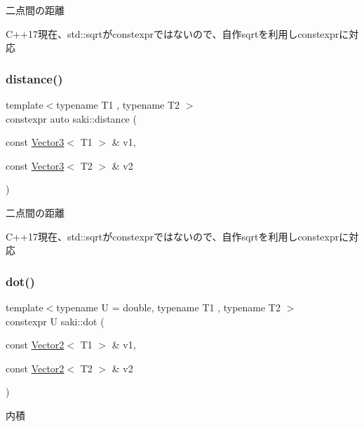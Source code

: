 二点間の距離 

C++17現在、std\+::sqrtがconstexprではないので、自作sqrtを利用しconstexprに対応 \mbox{\label{namespacesaki_a3e67ebd380889b661b2f72afc81ae005}} 
\subsubsection{\texorpdfstring{distance()}{distance()}\hspace{0.1cm}{\footnotesize\ttfamily [2/2]}}
{\footnotesize\ttfamily template$<$typename T1 , typename T2 $>$ \\
constexpr auto saki\+::distance (\begin{DoxyParamCaption}\item[{const \mbox{\hyperlink{classsaki_1_1_vector3}{Vector3}}$<$ T1 $>$ \&}]{v1,  }\item[{const \mbox{\hyperlink{classsaki_1_1_vector3}{Vector3}}$<$ T2 $>$ \&}]{v2 }\end{DoxyParamCaption})}



二点間の距離 

C++17現在、std\+::sqrtがconstexprではないので、自作sqrtを利用しconstexprに対応 \mbox{\label{namespacesaki_a724d6c36d761314950d3ec8be6a4f4ab}} 
\subsubsection{\texorpdfstring{dot()}{dot()}\hspace{0.1cm}{\footnotesize\ttfamily [1/2]}}
{\footnotesize\ttfamily template$<$typename U  = double, typename T1 , typename T2 $>$ \\
constexpr U saki\+::dot (\begin{DoxyParamCaption}\item[{const \mbox{\hyperlink{classsaki_1_1_vector2}{Vector2}}$<$ T1 $>$ \&}]{v1,  }\item[{const \mbox{\hyperlink{classsaki_1_1_vector2}{Vector2}}$<$ T2 $>$ \&}]{v2 }\end{DoxyParamCaption})}



内積 

\mbox{\label{namespacesaki_a4f2643c9bd618538a43cdad4a71398af}} 
